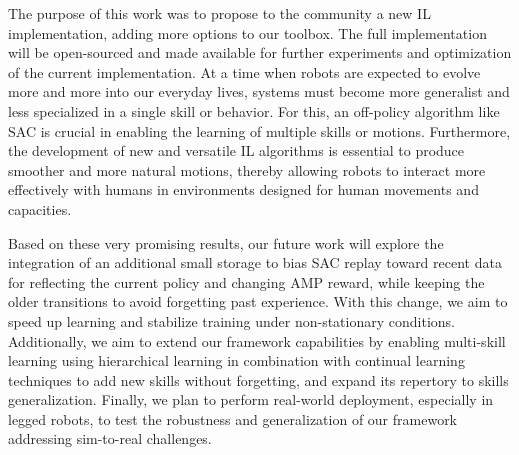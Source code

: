 \documentclass[letterpaper, 10pt, conference]{IEEEtran}
\begin{document}
The purpose of this work was to propose to the community a new IL implementation, adding more options to our toolbox. The full implementation will be open-sourced and made available for further experiments and optimization of the current implementation. At a time when robots are expected to evolve more and more into our everyday lives, systems must become more generalist and less specialized in a single skill or behavior. For this, an off-policy algorithm like SAC is crucial in enabling the learning of multiple skills or motions. Furthermore, the development of new and versatile IL algorithms is essential to produce smoother and more natural motions, thereby allowing robots to interact more effectively with humans in environments designed for human movements and capacities.

Based on these very promising results, our future work will explore the integration of an additional small storage to bias SAC replay toward recent data for reflecting the current policy and changing AMP reward, while keeping the older transitions to avoid forgetting past experience. With this change, we aim to speed up learning and stabilize training under non-stationary conditions. Additionally, we aim to extend our framework capabilities by enabling multi-skill learning using hierarchical learning in combination with continual learning techniques to add new skills without forgetting, and expand its repertory to skills generalization. Finally, we plan to perform real-world deployment, especially in legged robots, to test the robustness and generalization of our framework addressing sim-to-real challenges.
\end{document}

